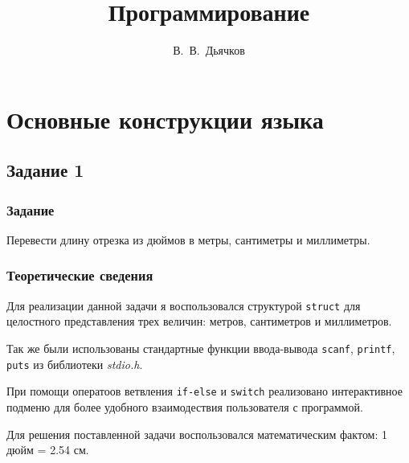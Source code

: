 \documentclass[12pt,a4paper]{report}
\author{В.~В.~Дьячков}
\title{Программирование}
\begin{document}
\maketitle
\chapter{Основные конструкции языка}
\section{Задание 1}
\subsection{Задание}

Перевести длину отрезка из дюймов в метры, сантиметры и миллиметры.

\subsection{Теоретические сведения}
\hspace{\parindent}Для реализации данной задачи я воспользовался структурой \texttt{struct} для целостного представления трех величин: метров, сантиметров и миллиметров. 

Так же были использованы стандартные функции ввода-вывода \texttt{scanf}, \texttt{printf}, \texttt{puts} из библиотеки \textit{stdio.h}.

При помощи оператоов ветвления \texttt{if-else} и \texttt{switch} реализовано интерактивное подменю для более удобного взаимодествия пользователя с программой.

Для решения поставленной задачи воспользовался математическим фактом: 1 дюйм = 2.54 см.
\end{document}
